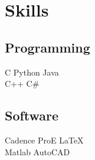 \documentclass[]{deedy-resume-new}
\begin{document}
%





\section{Skills}
\begin{minipage}[t]{.6\textwidth}
\subsection{Programming}
C \textbullet{} Python \textbullet{} Java \\
C++ \textbullet{} C\#\\
\sectionsep

\end{minipage}
\hfill
\begin{minipage}[t]{.35\textwidth}

\subsection{Software}
Cadence \textbullet{} ProE \textbullet{} \LaTeX  \\
Matlab \textbullet{} AutoCAD
\sectionsep

\end{minipage}
\end{document}
